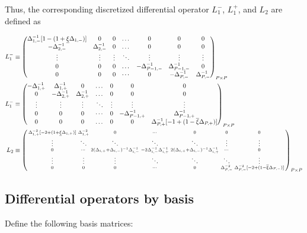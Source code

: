 \documentclass[11pt]{article}
\newenvironment{psmallmatrix}
{\left(\begin{smallmatrix}}
	{\end{smallmatrix}\right)}
\begin{document}
Thus, the corresponding discretized differential operator $L_1^{-}$, $L_1^{+}$, and $L_2$ are defined as 

\begin{align}
L_1^{-} &\equiv \begin{pmatrix}
\Delta^{-1}_{1,-} [1 - (1 + \underline{\xi} \Delta_{1,-})] &0&0&\dots&0&0&0\\
-\Delta_{2,-}^{-1}&\Delta_{2,-}^{-1}&0&\dots&0&0&0\\
\vdots&\vdots&\vdots&\ddots&\vdots&\vdots&\vdots\\
0&0&0&\dots&-\Delta_{P-1,-}^{-1}&\Delta_{P-1,-}^{-1}&0\\
0&0&0&\cdots&0&-\Delta_{P,-}^{-1}&\Delta_{P,-}^{-1}
\end{pmatrix}_{P\times P}\label{eq:L-1} \\
L_1^{-} &\equiv \begin{pmatrix}
-\Delta_{1,+}^{-1}&\Delta_{1,+}^{-1}&0&\dots&0&0&0\\
0&-\Delta_{2,+}^{-1}&\Delta_{2,+}^{-1}&\dots&0&0&0\\
\vdots&\vdots&\vdots&\ddots&\vdots&\vdots&\vdots\\
0&0&0&\cdots&0&-\Delta_{P-1,+}^{-1}&\Delta_{P-1,+}^{-1}\\
0&0&0&\dots&0&0&\Delta_{P,+}^{-1}  [-1 + (1 - \overline{\xi} \Delta_{P,+})]  \\
\end{pmatrix}_{P\times P}\label{eq:L-1-plus} \\
L_2 &\equiv \begin{psmallmatrix}
\Delta_{1,+}^{-2}[-2 + (1+\underline{\xi} \Delta_{1,+})] &\Delta_{1,+}^{-2}&0&\cdots&0&0&0 \\
\vdots&\ddots&\ddots&\ddots&\ddots&\vdots&\vdots\\
0&\cdots&2(\Delta_{i,+}+\Delta_{i,-})^{-1} \Delta_{i,-}^{-1} &-2\Delta_{i,-}^{-1} \Delta_{i,+}^{-1}  & 2 (\Delta_{i,+}+\Delta_{i,-})^{-1} \Delta_{i,+}^{-1}&\cdots&0 \\
\vdots&\vdots&\vdots&\ddots&\ddots&\ddots&\vdots\\
0&0&0&\cdots&0&\Delta_{P,-}^{-2}&\Delta_{P,-}^{-2} [-2 + (1- \overline{\xi}\Delta_{P,-})]
\end{psmallmatrix}_{P\times P}\label{eq:L-2}
\end{align}

\subsection{Differential operators by basis}
Define the following basis matrices:
\end{document}
